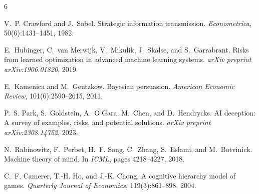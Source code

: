 \documentclass[11pt,letterpaper]{article}
\begin{document}

\begin{thebibliography}{6}

V.~P. Crawford and J.~Sobel.
\newblock Strategic information transmission.
\newblock \emph{Econometrica}, 50(6):1431--1451, 1982.

E.~Hubinger, C.~van Merwijk, V.~Mikulik, J.~Skalse, and S.~Garrabrant.
\newblock Risks from learned optimization in advanced machine learning systems.
\newblock \emph{arXiv preprint arXiv:1906.01820}, 2019.

E.~Kamenica and M.~Gentzkow.
\newblock Bayesian persuasion.
\newblock \emph{American Economic Review}, 101(6):2590--2615, 2011.

P.~S. Park, S.~Goldstein, A.~O'Gara, M.~Chen, and D.~Hendrycks.
\newblock AI deception: A survey of examples, risks, and potential solutions.
\newblock \emph{arXiv preprint arXiv:2308.14752}, 2023.

N.~Rabinowitz, F.~Perbet, H.~F. Song, C.~Zhang, S.~Eslami, and
  M.~Botvinick.
\newblock Machine theory of mind.
\newblock In \emph{ICML}, pages 4218--4227, 2018.

C.~F. Camerer, T.-H. Ho, and J.-K. Chong.
\newblock A cognitive hierarchy model of games.
\newblock \emph{Quarterly Journal of Economics}, 119(3):861--898, 2004.

\end{thebibliography}
\end{document}
